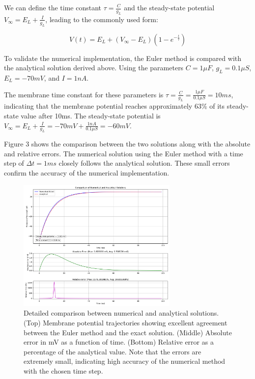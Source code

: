 \documentclass[11pt,a4paper]{article}
\begin{document}
We can define the time constant $\tau = \frac{C}{g_L}$ and the steady-state potential $V_{\infty} = E_L + \frac{I}{g_L}$, leading to the commonly used form:

\begin{equation}
V(t) = E_L + (V_{\infty} - E_L) (1 - e^{-\frac{t}{\tau}})
\end{equation}

To validate the numerical implementation, the Euler method is compared with the analytical solution derived above. Using the parameters $C = 1\mu F$, $g_L = 0.1\mu S$, $E_L = -70mV$, and $I = 1nA$. 

The membrane time constant for these parameters is $\tau = \frac{C}{g_L} = \frac{1\mu F}{0.1\mu S} = 10ms$, indicating that the membrane potential reaches approximately 63\% of its steady-state value after 10ms. The steady-state potential is $V_{\infty} = E_L + \frac{I}{g_L} = -70mV + \frac{1nA}{0.1\mu S} = -60mV$.

Figure 3 shows the comparison between the two solutions along with the absolute and relative errors. The numerical solution using the Euler method with a time step of $\Delta t = 1ms$ closely follows the analytical solution. These small errors confirm the accuracy of the numerical implementation.

\begin{figure}[ht]
    \centering
    \includegraphics[width=0.7\textwidth]{fig3.png}
    \caption{Detailed comparison between numerical and analytical solutions. (Top) Membrane potential trajectories showing excellent agreement between the Euler method and the exact solution. (Middle) Absolute error in mV as a function of time. (Bottom) Relative error as a percentage of the analytical value. Note that the errors are extremely small, indicating high accuracy of the numerical method with the chosen time step.}
\end{figure}
\pagebreak
\end{document}
